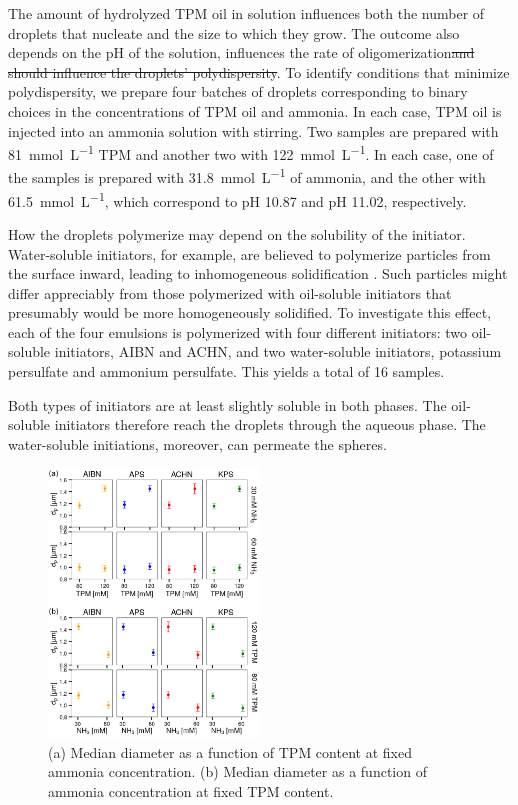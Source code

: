 \documentclass[journal=langd5,manuscript=article]{achemso}
\providecommand{\DIFadd}[1]{{\protect\color{blue}\uwave{#1}}} %
\providecommand{\DIFdel}[1]{{\protect\color{red}\sout{#1}}}                      %
\providecommand{\DIFaddbegin}{} %
\providecommand{\DIFaddend}{} %
\providecommand{\DIFdelbegin}{} %
\providecommand{\DIFdelend}{} %
\begin{document}
The amount of hydrolyzed 
TPM oil in solution influences both
the number of droplets that nucleate and
the size to which they grow.
The outcome also depends on the pH of the solution,
\DIFaddbegin \DIFadd{which }\DIFaddend influences the rate of oligomerization\DIFdelbegin \DIFdel{and should
influence the droplets' polydispersity}\DIFdelend .
To identify conditions that minimize polydispersity,
we prepare four batches of droplets
corresponding to binary choices in the
concentrations of TPM oil and ammonia.
In each case, TPM oil is injected into an ammonia solution
with stirring.
Two samples are prepared with \SI{81}{\milli\mole\per\liter}
TPM and another two with \SI{122}{\milli\mole\per\liter}.
In each case, one of the samples is prepared 
with \SI{31.8}{\milli\mole\per\liter} of ammonia,
and the other with \SI{61.5}{\milli\mole\per\liter}, which
correspond to pH \num{10.87} and pH \num{11.02}, respectively.

How the droplets polymerize may depend on the
solubility of the initiator.
Water-soluble initiators, for example, are believed
to polymerize particles from the surface inward,
leading to inhomogeneous solidification \cite{sacanna11}.
Such particles might differ appreciably from
those polymerized with oil-soluble initiators
that presumably would be more homogeneously solidified.
To investigate this effect, each of the four
emulsions is polymerized with four different initiators:
two oil-soluble initiators, AIBN and ACHN,
and two water-soluble  initiators, potassium persulfate 
and ammonium persulfate.
This yields a total of \num{16} samples.

Both types of initiators are at least slightly soluble in
both phases.  The oil-soluble initiators therefore reach the
droplets through the aqueous phase.  The water-soluble
initiations, moreover, can permeate the spheres.

\begin{figure}[!t]
  \centering
  \includegraphics[width=0.5\textwidth]{longitudinal_summary_02}
  \caption{
    (a) Median diameter as a function of TPM content
    at fixed ammonia concentration.
    (b) Median diameter as a function of ammonia
    concentration at fixed TPM content.}
  \label{fig:choices}
\end{figure}
\end{document}

